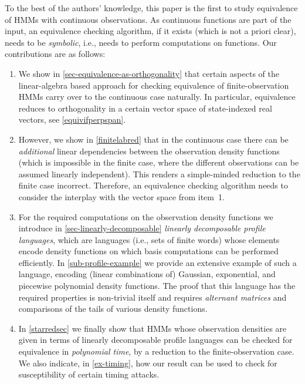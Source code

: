 \documentclass[a4paper,UKenglish,cleveref, autoref,mathscr, amsthm, thmtools, thm-restate]{lipics-v2019}
\newcommand{\1}{\mathbb{I}}
\begin{document}
To the best of the authors' knowledge, this paper is the first to study equivalence of HMMs with continuous observations.
As continuous functions are part of the input, an equivalence checking algorithm, if it exists (which is not a priori clear), needs to be \emph{symbolic}, i.e., needs to perform computations on functions.
Our contributions are as follows:
\begin{enumerate}
\item
We show in \cref{sec-equivalence-as-orthogonality} that certain aspects of the linear-algebra based approach for checking equivalence of finite-observation HMMs carry over to the continuous case naturally.
In particular, equivalence reduces to orthogonality in a certain vector space of state-indexed real vectors, see \cref{equivifperpspan}.
\item
However, we show in \cref{finitelabred} that in the continuous case there can be \emph{additional} linear dependencies between the observation density functions (which is impossible in the finite case, where the different observations can be assumed linearly independent).
This renders a simple-minded reduction to the finite case incorrect.
Therefore, an equivalence checking algorithm needs to consider the interplay with the vector space from item~1.
\item
For the required computations on the observation density functions we introduce in \cref{sec-linearly-decomposable} \emph{linearly decomposable profile languages}, which are languages (i.e., sets of finite words) whose elements encode density functions on which basis computations can be performed efficiently.
In \cref{sub-profile-example} we provide an extensive example of such a language, encoding (linear combinations of) Gaussian, exponential, and piecewise polynomial density functions.
The proof that this language has the required properties is non-trivial itself and requires \emph{alternant matrices} and comparisons of the tails of various density functions.
\item
In \cref{starredsec} we finally show that HMMs whose observation densities are given in terms of linearly decomposable profile languages can be checked for equivalence in \emph{polynomial time}, by a reduction to the finite-observation case.
We also indicate, in \cref{ex-timing}, how our result can be used to check for susceptibility of certain timing attacks.
\end{enumerate}
\end{document}
